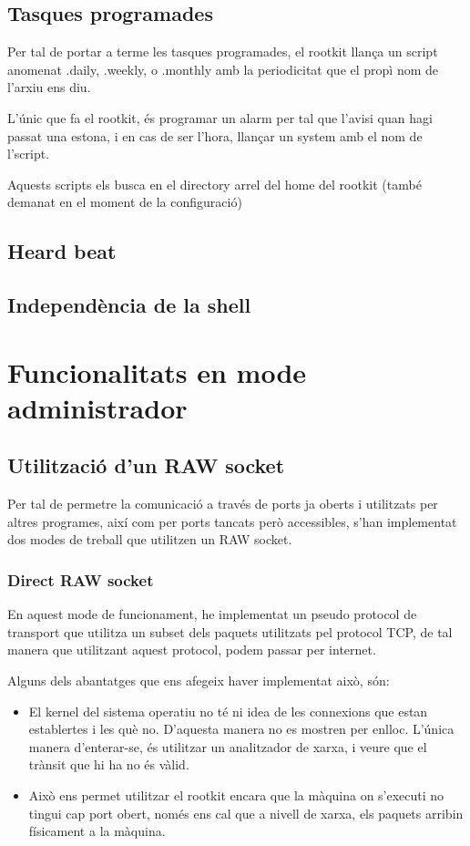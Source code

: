 \subsection{Tasques programades}
Per tal de portar a terme les tasques programades, el rootkit llança un script anomenat .daily, .weekly, o .monthly amb la periodicitat que el propì
nom de l'arxiu ens diu. 

L'únic que fa el rootkit, és programar un alarm per tal que l'avisi quan hagi passat una estona, i en cas de ser l'hora, llançar un system amb el nom
de l'script.

Aquests scripts els busca en el directory arrel del home del rootkit (també demanat en el moment de la configuració)

\subsection{Heard beat}
\subsection{Independència de la shell}
\section{Funcionalitats en mode administrador}
\subsection{Utilització d'un RAW socket}
Per tal de permetre la comunicació a través de ports ja oberts i utilitzats per altres programes, així com per ports tancats però accessibles, s'han
implementat dos modes de treball que utilitzen un RAW socket.

\subsubsection{Direct RAW socket}
En aquest mode de funcionament, he implementat un pseudo protocol de transport que utilitza un subset dels paquets utilitzats pel protocol TCP, de tal
manera que utilitzant aquest protocol, podem passar per internet. 

Alguns dels abantatges que ens afegeix haver implementat això, són:
\begin{itemize}
\item El kernel del sistema operatiu no té ni idea de les connexions que estan establertes i les què no. D'aquesta manera no es mostren per
enlloc. L'única manera d'enterar-se, és utilitzar un analitzador de xarxa, i veure que el trànsit que hi ha no és vàlid.
\item Això ens permet utilitzar el rootkit encara que la màquina on s'executi no tingui cap port obert, només ens cal que a nivell de xarxa, 
els paquets arribin físicament a la màquina.
\end{itemize}

